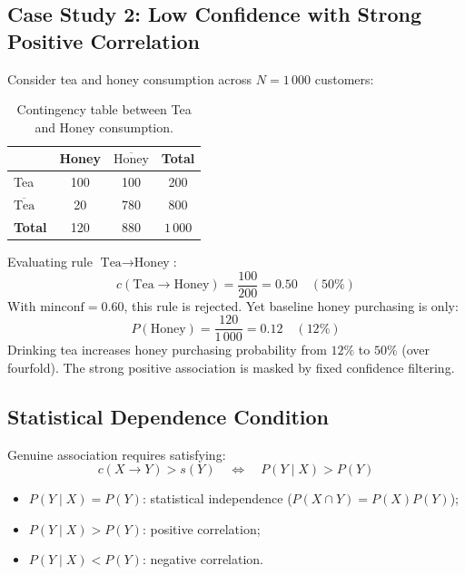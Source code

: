 \subsection{Case Study 2: Low Confidence with Strong Positive Correlation}
Consider tea and honey consumption across $N = 1\,000$ customers:

\begin{table}[htbp]
\centering
\small
\renewcommand{\arraystretch}{1.2}
\begin{tabular}{l c c c}
\toprule
& Honey & $\overline{\text{Honey}}$ & \textbf{Total} \\
\midrule
Tea & 100 & 100 & 200 \\
$\overline{\text{Tea}}$ & 20 & 780 & 800 \\
\midrule
\textbf{Total} & 120 & 880 & $1\,000$ \\
\bottomrule
\end{tabular}
\caption{Contingency table between Tea and Honey consumption.}
\label{tab:dm-tea-honey-paradox-en}
\end{table}

Evaluating rule $\text{Tea} \longrightarrow \text{Honey}$:
\begin{equation}
c(\text{Tea} \longrightarrow \text{Honey}) = \frac{100}{200} = 0.50 \quad (50\%)
\end{equation}
With $\mathrm{minconf} = 0.60$, this rule is rejected. Yet baseline honey purchasing is only:
\begin{equation}
P(\text{Honey}) = \frac{120}{1\,000} = 0.12 \quad (12\%)
\end{equation}
Drinking tea increases honey purchasing probability from $12\%$ to $50\%$ (over fourfold). The strong positive association is masked by fixed confidence filtering.

\subsection{Statistical Dependence Condition}
Genuine association requires satisfying:
\begin{equation}
\label{eq:dm-statistical-dependence-condition-en}
c(X \longrightarrow Y) > s(Y) \quad \Longleftrightarrow \quad P(Y \mid X) > P(Y)
\end{equation}
\begin{itemize}[noitemsep]
    \item $P(Y \mid X) = P(Y)$: statistical independence ($P(X \cap Y) = P(X)P(Y)$);
    \item $P(Y \mid X) > P(Y)$: positive correlation;
    \item $P(Y \mid X) < P(Y)$: negative correlation.
\end{itemize}


